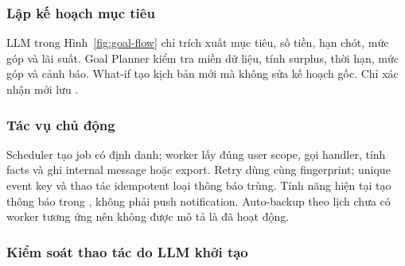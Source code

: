 \subsubsection{Lập kế hoạch mục tiêu}


LLM trong Hình~\ref{fig:goal-flow} chỉ trích xuất mục tiêu, số tiền, hạn chót, mức góp và lãi suất. Goal Planner kiểm tra miền dữ liệu, tính surplus, thời hạn, mức góp và cảnh báo. What-if tạo kịch bản mới mà không sửa kế hoạch gốc. Chỉ xác nhận mới lưu .

\subsubsection{Tác vụ chủ động}


Scheduler tạo job có định danh; worker lấy đúng user scope, gọi handler, tính facts và ghi internal message hoặc export. Retry dùng cùng fingerprint; unique event key và thao tác idempotent loại thông báo trùng. Tính năng hiện tại tạo thông báo trong , không phải push notification. Auto-backup theo lịch chưa có worker tương ứng nên không được mô tả là đã hoạt động.

\subsubsection{Kiểm soát thao tác do LLM khởi tạo}

